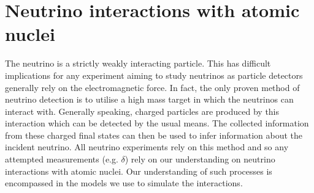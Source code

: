 


\chapter{Neutrino interactions with atomic nuclei}
\label{chap:NeutrinoInteractionsAtomicNuclei}
The neutrino is a strictly weakly interacting particle.  This has difficult implications for any experiment aiming to study neutrinos as particle detectors generally rely on the electromagnetic force.  In fact, the only proven method of neutrino detection is to utilise a high mass target in which the neutrinos can interact with.  Generally speaking, charged particles are produced by this interaction which can be detected by the usual means.  The collected information from these charged final states can then be used to infer information about the incident neutrino.  All neutrino experiments rely on this method and so any attempted measurements (e.g. $\delta$) rely on our understanding on neutrino interactions with atomic nuclei.  Our understanding of such processes is encompassed in the models we use to simulate the interactions.

